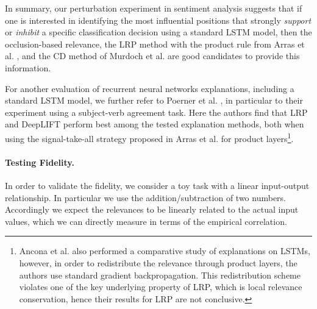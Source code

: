 \documentclass[runningheads]{llncs}
\begin{document}
In summary, our perturbation experiment in sentiment analysis suggests that if one is interested in identifying the most influential positions that strongly {\it support} or {\it inhibit} a specific classification decision using a standard LSTM model,
then the occlusion-based relevance, the LRP method with the product rule from Arras et al. \cite{Arr:Arras:17}, and the CD method of Murdoch et al. \cite{Arr:Murdoch:ICLR2018} are good candidates to provide this information.

For another evaluation of recurrent neural networks explanations, including a standard LSTM model, we further refer to Poerner et al. \cite{Arr:Poerner:ACL2018}, in particular to their experiment using a subject-verb agreement task. 
Here the authors find that LRP and DeepLIFT \cite{Arr:Shrikumar:PMLR2017} perform best among the tested explanation methods, both when using the signal-take-all strategy proposed in Arras et al. \cite{Arr:Arras:17} 
for product layers\footnote{Ancona et al. \cite{Arr:Ancona:ICLR2018} also performed a comparative study of explanations on LSTMs, however, in order to redistribute the relevance through product layers, the authors use standard gradient backpropagation. This redistribution scheme violates one of the key underlying property of LRP, which is local relevance conservation, hence their results for LRP are not conclusive.}.


\paragraph{Testing Fidelity.}
In order to validate the fidelity, we consider a toy task with a linear input-output relationship. In particular we use the addition/subtraction of two numbers.
Accordingly we expect the relevances to be linearly related to the actual input values, which we can directly measure in terms of the empirical correlation.
\end{document}
